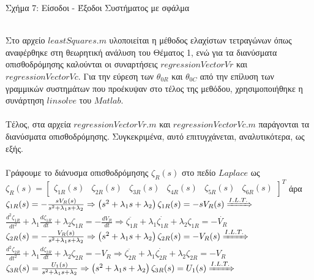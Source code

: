 \documentclass[12pt]{article}
\begin{document}
\centerline{Σχήμα 7: Είσοδοι - Έξοδοι Συστήματος με σφάλμα}
\newline
\newline
\\
Στο αρχείο $leastSquares.m$ υλοποιείται η μέθοδος ελαχίστων τετραγώνων όπως αναφέρθηκε στη θεωρητική ανάλυση του Θέματος 1, ενώ για τα διανύσματα οπισθοδρόμησης καλούνται οι συναρτήσεις $regressionVectorVr$ και $regressionVectorVc$. Για την εύρεση των $\theta_{0R}$ και $\theta_{0C}$ από την επίλυση των γραμμικών συστημάτων που προέκυψαν στο τέλος της μεθόδου, χρησιμοποιήθηκε η συνάρτηση $linsolve$ του $Matlab$.
\\ \\
Τέλος, στα αρχεία $regressionVectorVr.m$ και $regressionVectorVc.m$ παράγονται τα διανύσματα οπισθοδρόμησης. Συγκεκριμένα, αυτό επιτυγχάνεται, αναλυτικότερα, ως εξής.\\\\
Γράφουμε το διάνυσμα οπισθοδρόμησης $\zeta_{R}(s)$ στο πεδίο $Laplace$ ως
\\
$\zeta_{R}(s)=
\begin{bmatrix}
		\zeta_{1R}(s) & \zeta_{2R}(s) & \zeta_{3R}(s)  &  \zeta_{4R}(s)  &  \zeta_{5R}(s)  &  \zeta_{6R}(s)
\end{bmatrix}^{T}$ \quad άρα
\newline
\newline
$\zeta_{1R}(s)=-\frac{sV_{R}(s)}{s^2+\lambda_{1}s+\lambda_{2}} \Rightarrow \left( s^2+\lambda_{1}s+\lambda_{2} \right)\zeta_{1R}(s) = -sV_{R}(s)\xRightarrow{I.L.T.}$
\newline
$ \frac{d^2\zeta_{1R}}{dt^2} +\lambda_{1}\frac{d\zeta_{1R}}{dt}+\lambda_{2}\zeta_{1R}=-\frac{dV_{R}}{dt} \Rightarrow \ddot{\zeta_{1R}}+ \lambda_{1}\dot{\zeta_{1R}}+\lambda_{2}\zeta_{1R}=-\dot{V_{R}}$
\newline
\newline
\newline
$\zeta_{2R}(s)=-\frac{V_{R}(s)}{s^2+\lambda_{1}s+\lambda_{2}} \Rightarrow \left( s^2+\lambda_{1}s+\lambda_{2} \right)\zeta_{2R}(s) = -V_{R}(s)\xRightarrow{I.L.T.}$
\newline
$ \frac{d^2\zeta_{2R}}{dt^2} +\lambda_{1}\frac{d\zeta_{2R}}{dt}+\lambda_{2}\zeta_{2R}=-V_{R} \Rightarrow \ddot{\zeta_{2R}} +\lambda_{1}\dot{\zeta_{2R}}+\lambda_{2}\zeta_{2R}=-V_{R}$
\newline
\newline
\newline
$\zeta_{3R}(s)=\frac{U_{1}(s)}{s^2+\lambda_{1}s+\lambda_{2}} \Rightarrow \left( s^2+\lambda_{1}s+\lambda_{2} \right)\zeta_{3R}(s) = U_{1}(s)\xRightarrow{I.L.T.}$
\end{document}
